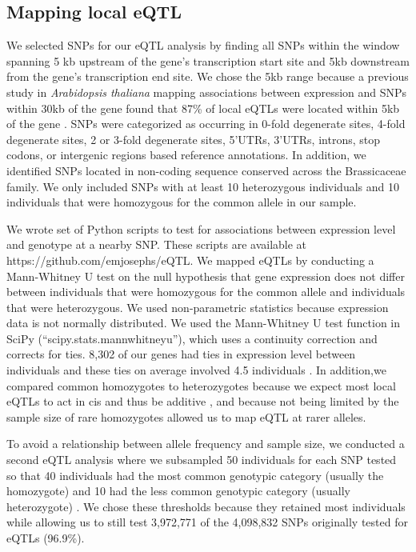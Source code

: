\subsection{Mapping local eQTL}
We selected SNPs for our eQTL analysis by finding all SNPs within the window spanning 5 kb upstream of the gene’s transcription start site and 5kb downstream from the gene’s transcription end site. We chose the 5kb range because a previous study in \textit{Arabidopsis thaliana} mapping associations between expression and SNPs within 30kb of the gene found that 87\% of local eQTLs were located within 5kb of the gene \citep{Gan2011-xv}. SNPs were categorized as occurring in 0-fold degenerate sites, 4-fold degenerate sites, 2 or 3-fold degenerate sites, 5'UTRs, 3'UTRs, introns, stop codons, or intergenic regions based reference annotations\citep{Slotte2013-py}. In addition, we identified SNPs located in non-coding sequence conserved across the Brassicaceae family\citep{Haudry2013-qe}. We only included SNPs with at least 10 heterozygous individuals and 10 individuals that were homozygous for the common allele in our sample.

We wrote set of Python scripts to test for associations between expression level and genotype at a nearby SNP. These scripts are available at https://github.com/emjosephs/eQTL. We mapped eQTLs by conducting a Mann-Whitney U test on the null hypothesis that gene expression does not differ between individuals that were homozygous for the common allele and individuals that were heterozygous. We used non-parametric statistics because expression data is not normally distributed. We used the Mann-Whitney U test function in SciPy (“scipy.stats.mannwhitneyu”), which uses a continuity correction and corrects for ties. 8,302 of our genes had ties in expression level between individuals and these ties on average involved 4.5 individuals \citep{Jones2001-in}. In addition,we compared common homozygotes to heterozygotes because we expect most local eQTLs to act in cis and thus be additive \citep{Pickrell2010-ci}, and because not being limited by the sample size of rare homozygotes allowed us to map eQTL at rarer alleles. 

To avoid a relationship between allele frequency and sample size, we conducted a second eQTL analysis where we subsampled 50 individuals for each SNP tested so that 40 individuals had the most common genotypic category (usually the homozygote) and 10 had the less common genotypic category (usually heterozygote) \citep{Battle2014-ke}. We chose these thresholds because they retained most individuals while allowing us to still test 3,972,771 of the 4,098,832 SNPs originally tested for eQTLs (96.9\%).

